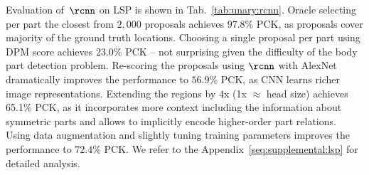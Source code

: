  Evaluation of~$\rcnn$ on LSP is shown in
Tab.~\ref{tab:unary:rcnn}. Oracle selecting per part the closest
from $2,000$ proposals achieves $97.8$\% PCK, as proposals cover majority
of the ground truth locations. Choosing a single proposal per part
using DPM score achieves $23.0$\% PCK -- not surprising given the
difficulty of the body part detection problem. Re-scoring the
proposals using $\rcnn$ with AlexNet~\cite{krizhevsky12nips}
dramatically improves the performance to $56.9$\% PCK, as CNN learns
richer image representations.
Extending the regions by $4$x (1x $\approx$ head size) achieves 65.1\%
PCK, as it incorporates more context including the information about
symmetric parts and allows to implicitly encode higher-order part
relations. %
Using data augmentation and slightly tuning training parameters
improves the performance to $72.4$\% PCK. We refer to the
Appendix~\ref{seq:supplemental:lsp} for detailed analysis.
